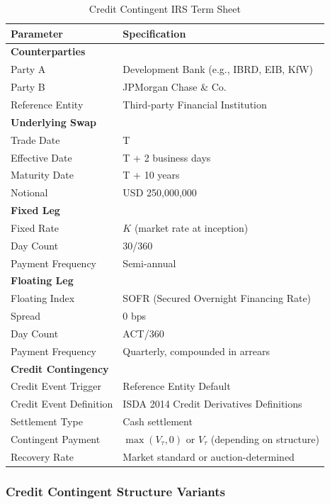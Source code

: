 \documentclass[conference]{IEEEtran}
\theoremstyle{definition}
\begin{document}
\begin{table}[ht]
\centering
\caption{Credit Contingent IRS Term Sheet}
\label{tab:ccirs_credit_terms}
\begin{tabular}{ll}
\toprule
\textbf{Parameter} & \textbf{Specification} \\
\midrule
\multicolumn{2}{l}{\textbf{Counterparties}} \\
Party A & Development Bank (e.g., IBRD, EIB, KfW) \\
Party B & JPMorgan Chase \& Co. \\
Reference Entity & Third-party Financial Institution \\
\midrule
\multicolumn{2}{l}{\textbf{Underlying Swap}} \\
Trade Date & T \\
Effective Date & T + 2 business days \\
Maturity Date & T + 10 years \\
Notional & USD 250,000,000 \\
\midrule
\multicolumn{2}{l}{\textbf{Fixed Leg}} \\
Fixed Rate & $K$ (market rate at inception) \\
Day Count & 30/360 \\
Payment Frequency & Semi-annual \\
\midrule
\multicolumn{2}{l}{\textbf{Floating Leg}} \\
Floating Index & SOFR (Secured Overnight Financing Rate) \\
Spread & 0 bps \\
Day Count & ACT/360 \\
Payment Frequency & Quarterly, compounded in arrears \\
\midrule
\multicolumn{2}{l}{\textbf{Credit Contingency}} \\
Credit Event Trigger & Reference Entity Default \\
Credit Event Definition & ISDA 2014 Credit Derivatives Definitions \\
Settlement Type & Cash settlement \\
Contingent Payment & $\max(V_{\tau}, 0)$ or $V_{\tau}$ (depending on structure) \\
Recovery Rate & Market standard or auction-determined \\
\bottomrule
\end{tabular}
\end{table}

\subsubsection{Credit Contingent Structure Variants}
\end{document}
